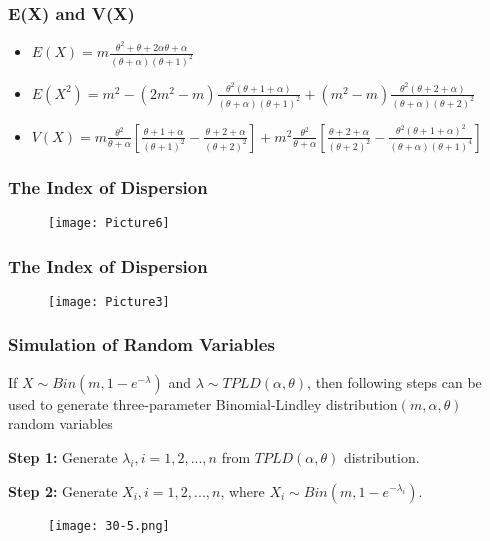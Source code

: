 \documentclass{beamer}
\begin{document}
\begin{frame}
\frametitle{E(X) and V(X)}
\begin{itemize}
\item $E(X)=m\frac{\theta^2+\theta+2\alpha\theta+\alpha}{(\theta+\alpha)(\theta+1)^2}$

\bigskip
\item$E(X^2)=m^2 - (2m^2-m) \frac{\theta^2(\theta+1+\alpha)}{(\theta+\alpha)(\theta+1)^2}+ (m^2-m)\frac{\theta^2(\theta+2+\alpha)}{(\theta+\alpha)(\theta+2)^2}$

\bigskip
\item $V(X)= m\frac{\theta^2}{\theta+\alpha}\left[ \frac{\theta+1+\alpha}{(\theta+1)^2}-\frac{\theta+2+\alpha}{(\theta+2)^2}\right]+ m^2\frac{\theta^2}{\theta+\alpha}\left[ \frac{\theta+2+\alpha}{(\theta+2)^2} - \frac{\theta^2(\theta+1+\alpha)^2}{(\theta+\alpha)(\theta+1)^4}\right]$
\end{itemize}

\end{frame}

\begin{frame}
\frametitle{The Index of Dispersion}
\begin{figure}
\centering
\texttt{[image: Picture6]}
\end{figure} 
\end{frame}

\begin{frame}
\frametitle{The Index of Dispersion}
\begin{figure}
\centering
\texttt{[image: Picture3]}
\end{figure}
\end{frame}

\begin{frame}
\frametitle{Simulation of Random Variables}
If $X \sim Bin(m,1-e^{-\lambda})$ and $\lambda\sim TPLD(\alpha,\theta)$, then following steps can be used to generate three-parameter Binomial-Lindley distribution$(m,\alpha,\theta)$ random variables

\bigskip
\textbf{Step 1:} Generate $\lambda_{i}, i=1,2,...,n$ from $TPLD(\alpha,\theta)$ distribution.

\bigskip
\textbf{Step 2:} Generate $X_{i}, i=1,2,...,n$, where $X_{i}\sim Bin(m,1-e^{-\lambda_{i}})$.
\end{frame}

\begin{frame}
\begin{figure}
\centering
\texttt{[image: 30-5.png]}
\end{figure}
\end{frame}
\end{document}

